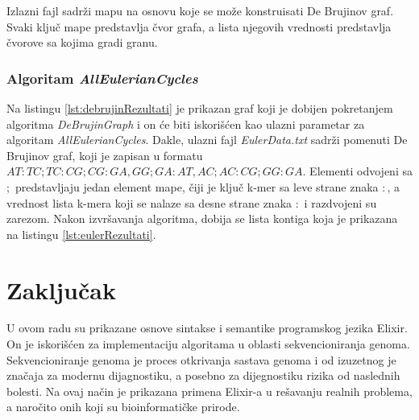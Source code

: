 \documentclass[12pt,oneside]{memoir}
\begin{document}


Izlazni fajl sadrži mapu na osnovu koje se može konstruisati De Brujinov graf. Svaki ključ mape predstavlja čvor grafa, a lista njegovih vrednosti predstavlja čvorove sa kojima gradi granu.

\subsection{Algoritam \textit{AllEulerianCycles}}

Na listingu \ref{lst:debrujinRezultati} je prikazan graf koji je dobijen pokretanjem algoritma \textit{DeBrujinGraph} i on će biti iskorišćen kao ulazni parametar za algoritam \textit{AllEulerianCycles}. Dakle, ulazni fajl \textit{EulerData.txt} sadrži pomenuti De Brujinov graf, koji je zapisan u formatu $AT:TC;TC:CG;CG:GA,GG;GA:AT,AC;AC:CG;GG:GA$. Elementi odvojeni sa $;$ predstavljaju jedan element mape, čiji je ključ k-mer sa leve strane znaka $:$, a vrednost lista k-mera koji se nalaze sa desne strane znaka $:$ i razdvojeni su zarezom. Nakon izvršavanja algoritma, dobija se lista kontiga koja je prikazana na listingu \ref{lst:eulerRezultati}.



\chapter{Zaključak}
\label{poglavlje:Zaključak}

U ovom radu su prikazane osnove sintakse i semantike programskog jezika Elixir. On je iskorišćen za implementaciju algoritama u oblasti sekvencioniranja genoma. Sekvencioniranje genoma je proces otkrivanja sastava genoma i od izuzetnog je značaja za modernu dijagnostiku, a posebno za dijegnostiku rizika od naslednih bolesti. Na ovaj način je prikazana primena Elixir-a u rešavanju realnih problema, a naročito onih koji su bioinformatičke prirode.
\end{document}
